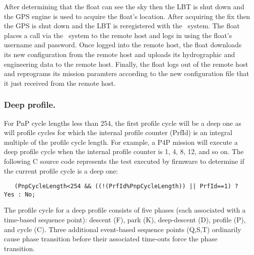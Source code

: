 \begin{description}
  After determining that the float can see the sky then the LBT is shut down
  and the GPS engine is used to acquire the float's location.  After
  acquiring the fix then the GPS is shut down and the LBT is reregistered
  with the \iridium\ system.  The float places a call via the \iridium\
  system to the remote host and logs in using the float's username and
  password.  Once logged into the remote host, the float downloads its new
  configuration from the remote host and uploads its hydrographic and
  engineering data to the remote host.  Finally, the float logs out of the
  remote host and reprograms its mission paramters according to the new
  configuration file that it just received from the remote host.
\end{description}

\subsubsection{Deep profile.}
\label{sec:DeepProfileCycle}

For PnP cycle lengths less than 254, the first profile cycle will be a deep
one as will profile cycles for which the internal profile counter (PrfId) is
an integral multiple of the profile cycle length.  For example, a P4P
mission will execute a deep profile cycle when the internal profile counter
is 1, 4, 8, 12, and so on.  The following C source code represents the test
executed by firmware to determine if the current profile cycle is a deep
one:

   \begin{verbatim}
   (PnpCycleLength<254 && ((!(PrfId%PnpCycleLength)) || PrfId==1) ? Yes : No;
   \end{verbatim}                    

The profile cycle for a deep profile consists of five phases (each
associated with a time-based sequence point): descent (F), park (K),
deep-descent (D), profile (P), and cycle (C).  Three additional event-based
sequence points (Q,S,T) ordinarily cause phase transition before their
associated time-outs force the phase transition.
   
